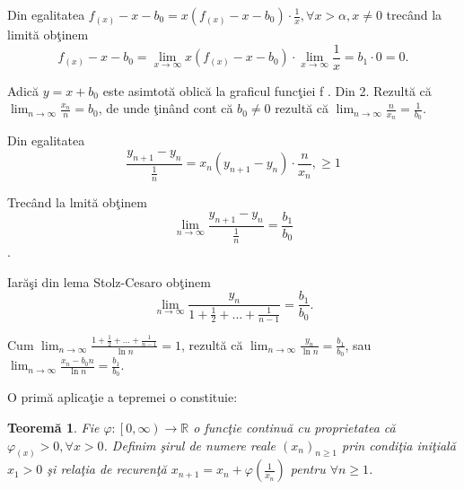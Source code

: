 \documentclass[a4paper,12pt,oneside]{report}
\newtheorem{theorem}{Teorem\u a}
\begin{document}
Din egalitatea \(f_{\left ( x \right )}-x-b_{0}= x\left ( f_{\left ( x \right )}-x-b_{0} \right )\cdot \frac{1}{x}, \forall x>\alpha,x  \neq 0\) trec\^ and la limit\u a ob\c tinem 
\begin{displaymath}
  f_{\left ( x \right )}-x-b_{0}= \lim_{x \to \infty }x\left ( f_{\left ( x \right )}-x-b_{0} \right )\cdot \lim_{x \to \infty }\frac{1}{x} = b_{1}\cdot 0 = 0.
\end{displaymath}

Adic\u a \(y=x+b_{0}\) este asimtot\u a oblic\u a la graficul func\c tiei f . Din 2. Rezult\u a c\u a \(\lim_{n \to \infty }\frac{x_{n}}{n} = b_{0}\), de unde \c tin\^ and cont c\u a \(b_{0}\neq 0\) rezult\u a c\u a \(\lim_{n \to \infty }\frac{n}{x_{n}} = \frac{1}{b_{0}}\). 


Din egalitatea
 \begin{displaymath}
  \frac{y_{n+1} - y_{n}}{\frac{1}{n}} = x_{n}\left ( y_{n+1} -y_{n}\right )\cdot \frac{n}{x_{n}}, \geq 1
\end{displaymath}

Trec\^ and la lmit\u a ob\c tinem 
\begin{displaymath}
  \lim_{n \to \infty }\frac{y_{n+1} - y_{n}}{\frac{1}{n}} = \frac{b_{1}}{b_{0}}
\end{displaymath}
.

Iar\u a\c si din lema Stolz-Cesaro ob\c tinem 
\begin{displaymath}
  \lim_{n \to \infty }\frac{y_{n}}{1+\frac{1}{2}+...+\frac{1}{n-1}} = \frac{b_{1}}{b_{0}} . 
\end{displaymath}

Cum \(\lim_{n \to \infty }\frac{{1+\frac{1}{2}+...+\frac{1}{n-1}}}{\ln n} = 1\), rezult\u a c\u a \(\lim_{n \to \infty }\frac{y_{n}}{\ln n } = \frac{b_{1}}{b_{0}}\), sau \(\lim_{n \to \infty }\frac{x_{n}-b_{0}n}{\ln n }  = \frac{b_{1}}{b_{0}}\).


O prim\u a aplica\c tie a tepremei o constituie:

\begin{theorem}
  Fie \(\varphi : \left [ 0,\infty  \right ) \to \mathbb{R}\) o func\c tie continu\u a cu proprietatea c\u a \(\varphi_{\left ( x \right )}> 0, \forall x> 0\). Definim \c sirul de numere reale \(\left ( x_{n} \right )_{n\geq 1}\) prin condi\c tia ini\c tial\u a \(x_{1}> 0\) \c si rela\c tia de recuren\c t\u a \(x_{n+1} = x_{n} + \varphi \left ( \frac{1}{x_{n}} \right )\) pentru \(\forall  n\geq 1\). 
\end{theorem}
\end{document}

